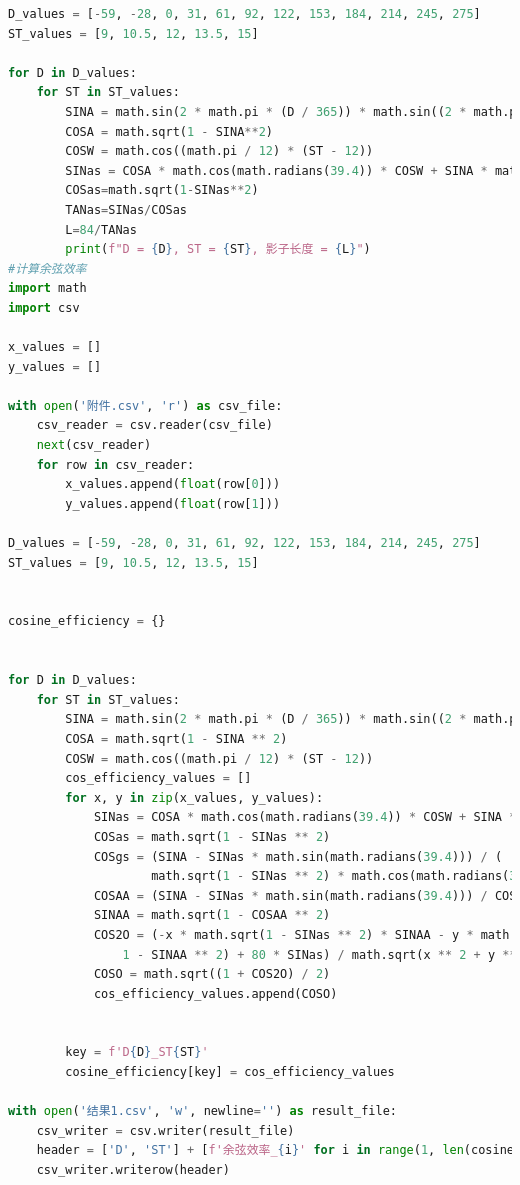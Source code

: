 \documentclass[withoutpreface,bwprint]{cumcmthesis} %
\begin{document}
\begin{appendices}
\begin{lstlisting}[language=python]
D_values = [-59, -28, 0, 31, 61, 92, 122, 153, 184, 214, 245, 275]
ST_values = [9, 10.5, 12, 13.5, 15]

for D in D_values:
    for ST in ST_values:
        SINA = math.sin(2 * math.pi * (D / 365)) * math.sin((2 * math.pi / 360) * 23.45)
        COSA = math.sqrt(1 - SINA**2)
        COSW = math.cos((math.pi / 12) * (ST - 12))
        SINas = COSA * math.cos(math.radians(39.4)) * COSW + SINA * math.sin(math.radians(39.4))
        COSas=math.sqrt(1-SINas**2)
        TANas=SINas/COSas
        L=84/TANas
        print(f"D = {D}, ST = {ST}, 影子长度 = {L}")
#计算余弦效率
import math
import csv

x_values = []
y_values = []

with open('附件.csv', 'r') as csv_file:
    csv_reader = csv.reader(csv_file)
    next(csv_reader)
    for row in csv_reader:
        x_values.append(float(row[0]))
        y_values.append(float(row[1]))

D_values = [-59, -28, 0, 31, 61, 92, 122, 153, 184, 214, 245, 275]
ST_values = [9, 10.5, 12, 13.5, 15]


cosine_efficiency = {}


for D in D_values:
    for ST in ST_values:
        SINA = math.sin(2 * math.pi * (D / 365)) * math.sin((2 * math.pi / 360) * 23.45)
        COSA = math.sqrt(1 - SINA ** 2)
        COSW = math.cos((math.pi / 12) * (ST - 12))
        cos_efficiency_values = []  
        for x, y in zip(x_values, y_values):
            SINas = COSA * math.cos(math.radians(39.4)) * COSW + SINA * math.sin(math.radians(39.4))
            COSas = math.sqrt(1 - SINas ** 2)
            COSgs = (SINA - SINas * math.sin(math.radians(39.4))) / (
                    math.sqrt(1 - SINas ** 2) * math.cos(math.radians(39.4)))
            COSAA = (SINA - SINas * math.sin(math.radians(39.4))) / COSas * math.cos(math.radians(39.4))
            SINAA = math.sqrt(1 - COSAA ** 2)
            COS2O = (-x * math.sqrt(1 - SINas ** 2) * SINAA - y * math.sqrt(1 - SINas ** 2) * math.sqrt(
                1 - SINAA ** 2) + 80 * SINas) / math.sqrt(x ** 2 + y ** 2 + 80 ** 2)
            COSO = math.sqrt((1 + COS2O) / 2)
            cos_efficiency_values.append(COSO)

     
        key = f'D{D}_ST{ST}'
        cosine_efficiency[key] = cos_efficiency_values

with open('结果1.csv', 'w', newline='') as result_file:
    csv_writer = csv.writer(result_file)
    header = ['D', 'ST'] + [f'余弦效率_{i}' for i in range(1, len(cosine_efficiency['D-59_ST9']) + 1)]
    csv_writer.writerow(header)


\end{lstlisting}
\end{appendices}
\end{document}
